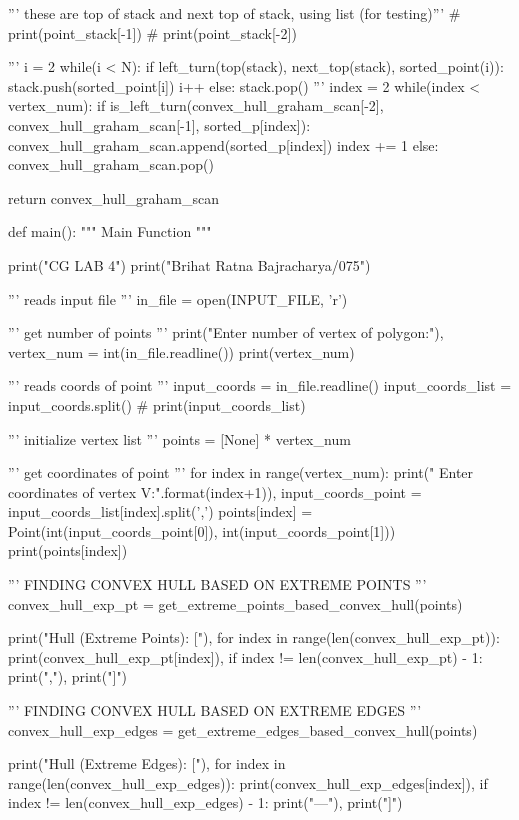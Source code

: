 \documentclass[a4paper,12pt]{article}
\begin{document}
\begin{spacing}{1}
\begin{footnotesize}
\begin{spverbatim}
    ''' these are top of stack and next top of stack, using list (for testing)'''
    # print(point_stack[-1])
    # print(point_stack[-2])

    '''
        i = 2
        while(i < N):
            if left_turn(top(stack), next_top(stack), sorted_point(i)):
                stack.push(sorted_point[i])
                i++
            else:
                stack.pop()
    '''
    index = 2
    while(index < vertex_num):
        if is_left_turn(convex_hull_graham_scan[-2], convex_hull_graham_scan[-1], sorted_p[index]):
            convex_hull_graham_scan.append(sorted_p[index])
            index += 1
        else:
            convex_hull_graham_scan.pop()

    return convex_hull_graham_scan

def main():
    """ Main Function """

    print("CG LAB 4")
    print("Brihat Ratna Bajracharya/075\n")

    ''' reads input file '''
    in_file = open(INPUT_FILE, 'r')

    ''' get number of points '''
    print("Enter number of vertex of polygon:"),
    vertex_num = int(in_file.readline())
    print(vertex_num)

    ''' reads coords of point '''
    input_coords = in_file.readline()
    input_coords_list = input_coords.split()
    # print(input_coords_list)

    ''' initialize vertex list '''
    points = [None] * vertex_num

    ''' get coordinates of point '''
    for index in range(vertex_num):
        print(" Enter coordinates of vertex V{}:".format(index+1)),
        input_coords_point = input_coords_list[index].split(',')
        points[index] = Point(int(input_coords_point[0]), int(input_coords_point[1]))
        print(points[index])

    ''' FINDING CONVEX HULL BASED ON EXTREME POINTS '''
    convex_hull_exp_pt = get_extreme_points_based_convex_hull(points)

    print("\nConvex Hull (Extreme Points): ["),
    for index in range(len(convex_hull_exp_pt)):
        print(convex_hull_exp_pt[index]),
        if index != len(convex_hull_exp_pt) - 1:
            print(","),
    print("]")

    ''' FINDING CONVEX HULL BASED ON EXTREME EDGES '''
    convex_hull_exp_edges = get_extreme_edges_based_convex_hull(points)

    print("\nConvex Hull (Extreme Edges): ["),
    for index in range(len(convex_hull_exp_edges)):
        print(convex_hull_exp_edges[index]),
        if index != len(convex_hull_exp_edges) - 1:
            print("---"),
    print("]")


\end{spverbatim}
\end{footnotesize}
\end{spacing}
\end{document}
